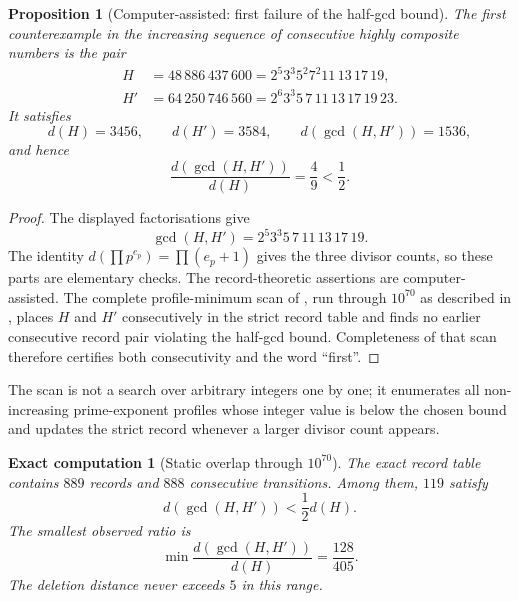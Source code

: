 \documentclass[11pt]{article}
\numberwithin{equation}{section}
\theoremstyle{blueplain}
\newtheorem{proposition}[theorem]{Proposition}
\theoremstyle{bluedef}
\newtheorem{computation}[theorem]{Exact computation}
\begin{document}
\begin{proposition}[Computer-assisted: first failure of the half-gcd bound]
\label{prop:first-half-gcd-counterexample}
The first counterexample in the increasing sequence of consecutive highly composite numbers is the pair
\begin{align*}
 H&=48\,886\,437\,600
   =2^5 3^3 5^2 7^2 11\,13\,17\,19,\\
 H'&=64\,250\,746\,560
   =2^6 3^3 5\,7\,11\,13\,17\,19\,23.
\end{align*}
It satisfies
\begin{equation}
 d(H)=3456,
 \qquad
 d(H')=3584,
 \qquad
 d(\gcd(H,H'))=1536,
 \label{eq:first-half-gcd-data}
\end{equation}
and hence
\begin{equation}
 \frac{d(\gcd(H,H'))}{d(H)}=\frac49<\frac12.
 \label{eq:first-half-gcd-ratio}
\end{equation}
\end{proposition}

\begin{proof}
The displayed factorisations give
\[
 \gcd(H,H')=2^5 3^3 5\,7\,11\,13\,17\,19.
\]
The identity $d(\prod p^{e_p})=\prod(e_p+1)$ gives the three divisor counts, so these parts are elementary checks.  The record-theoretic assertions are computer-assisted.  The complete profile-minimum scan of , run through $10^{70}$ as described in , places $H$ and $H'$ consecutively in the strict record table and finds no earlier consecutive record pair violating the half-gcd bound.  Completeness of that scan therefore certifies both consecutivity and the word ``first''.
\end{proof}

The scan is not a search over arbitrary integers one by one; it enumerates all non-increasing prime-exponent profiles whose integer value is below the chosen bound and updates the strict record whenever a larger divisor count appears.

\begin{computation}[Static overlap through $10^{70}$]
\label{comp:gcd-stress}
The exact record table contains $889$ records and $888$ consecutive transitions.  Among them, $119$ satisfy
\[
 d(\gcd(H,H'))<\frac12d(H).
\]
The smallest observed ratio is
\begin{equation}
 \boxed{\min\frac{d(\gcd(H,H'))}{d(H)}=\frac{128}{405}.}
 \label{eq:min-gcd-ratio}
\end{equation}
The deletion distance never exceeds $5$ in this range.
\end{computation}
\end{document}
